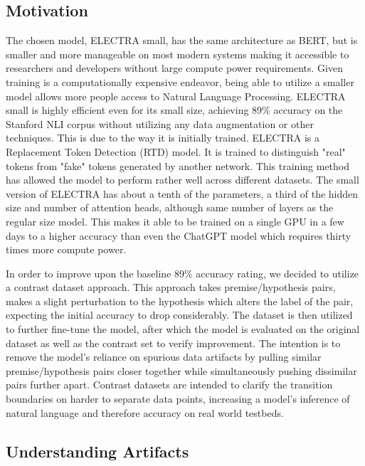 \documentclass[11pt]{article}
\begin{document}
\subsection{Motivation}

The chosen model, ELECTRA small, has the same architecture as BERT, but is smaller and more manageable on most modern systems making it accessible to researchers and developers without large compute power requirements. Given training is a computationally expensive endeavor, being able to utilize a smaller model allows more people access to Natural Language Processing. ELECTRA small is highly efficient even for its small size, achieving 89\% accuracy on the Stanford NLI corpus without utilizing any data augmentation or other techniques. This is due to the way it is initially trained. ELECTRA is a Replacement Token Detection (RTD) model. It is trained to distinguish "real" tokens from "fake" tokens generated by another network. This training method has allowed the model to perform rather well across different datasets.  The small version of ELECTRA has about a tenth of the parameters, a third of the hidden size and number of attention heads, although same number of layers as the regular size model. This makes it able to be trained on a single GPU in a few days to a higher accuracy than even the ChatGPT model which requires thirty times more compute power. \citealp{googleelectrablog}

In order to improve upon the baseline 89\% accuracy rating, we decided to utilize a contrast dataset approach. This approach takes premise/hypothesis pairs, makes a slight perturbation to the hypothesis which alters the label of the pair, expecting the initial accuracy to drop considerably.  The dataset is then utilized to further fine-tune the model, after which the model is evaluated on the original dataset as well as the contrast set to verify improvement. The intention is to remove the model's reliance on spurious data artifacts by pulling similar premise/hypothesis pairs closer together while simultaneously pushing dissimilar pairs further apart.  Contrast datasets are intended to clarify the transition boundaries on harder to separate data points, increasing a model's inference of natural language and therefore accuracy on real world testbeds. \citealp{localdecisionboundaries}

\subsection{Understanding Artifacts}
\end{document}
